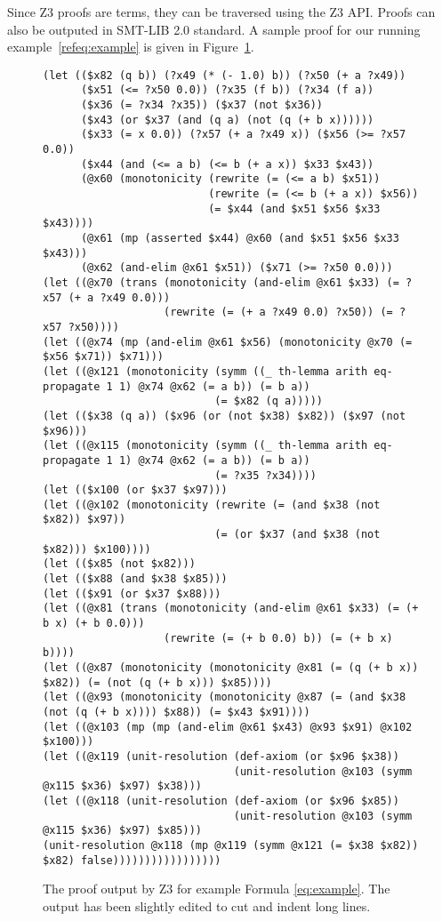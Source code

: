 \documentclass{llncs}
\begin{document}
Since Z3 proofs are terms, they can be traversed using the Z3 API.
Proofs can also be outputed in SMT-LIB 2.0 standard. A sample proof
for our running example~\ref{refeq:example} is given in
Figure~\ref{fig:proofz3}.

\begin{figure}
{\scriptsize
\begin{verbatim}
(let (($x82 (q b)) (?x49 (* (- 1.0) b)) (?x50 (+ a ?x49))
      ($x51 (<= ?x50 0.0)) (?x35 (f b)) (?x34 (f a))
      ($x36 (= ?x34 ?x35)) ($x37 (not $x36))
      ($x43 (or $x37 (and (q a) (not (q (+ b x))))))
      ($x33 (= x 0.0)) (?x57 (+ a ?x49 x)) ($x56 (>= ?x57 0.0))
      ($x44 (and (<= a b) (<= b (+ a x)) $x33 $x43))
      (@x60 (monotonicity (rewrite (= (<= a b) $x51))
                          (rewrite (= (<= b (+ a x)) $x56))
                          (= $x44 (and $x51 $x56 $x33 $x43))))
      (@x61 (mp (asserted $x44) @x60 (and $x51 $x56 $x33 $x43)))
      (@x62 (and-elim @x61 $x51)) ($x71 (>= ?x50 0.0)))
(let ((@x70 (trans (monotonicity (and-elim @x61 $x33) (= ?x57 (+ a ?x49 0.0)))
                   (rewrite (= (+ a ?x49 0.0) ?x50)) (= ?x57 ?x50))))
(let ((@x74 (mp (and-elim @x61 $x56) (monotonicity @x70 (= $x56 $x71)) $x71)))
(let ((@x121 (monotonicity (symm ((_ th-lemma arith eq-propagate 1 1) @x74 @x62 (= a b)) (= b a))
                           (= $x82 (q a)))))
(let (($x38 (q a)) ($x96 (or (not $x38) $x82)) ($x97 (not $x96)))
(let ((@x115 (monotonicity (symm ((_ th-lemma arith eq-propagate 1 1) @x74 @x62 (= a b)) (= b a))
                           (= ?x35 ?x34))))
(let (($x100 (or $x37 $x97)))
(let ((@x102 (monotonicity (rewrite (= (and $x38 (not $x82)) $x97))
                           (= (or $x37 (and $x38 (not $x82))) $x100))))
(let (($x85 (not $x82)))
(let (($x88 (and $x38 $x85)))
(let (($x91 (or $x37 $x88)))
(let ((@x81 (trans (monotonicity (and-elim @x61 $x33) (= (+ b x) (+ b 0.0)))
                   (rewrite (= (+ b 0.0) b)) (= (+ b x) b))))
(let ((@x87 (monotonicity (monotonicity @x81 (= (q (+ b x)) $x82)) (= (not (q (+ b x))) $x85))))
(let ((@x93 (monotonicity (monotonicity @x87 (= (and $x38 (not (q (+ b x)))) $x88)) (= $x43 $x91))))
(let ((@x103 (mp (mp (and-elim @x61 $x43) @x93 $x91) @x102 $x100)))
(let ((@x119 (unit-resolution (def-axiom (or $x96 $x38))
                              (unit-resolution @x103 (symm @x115 $x36) $x97) $x38)))
(let ((@x118 (unit-resolution (def-axiom (or $x96 $x85))
                              (unit-resolution @x103 (symm @x115 $x36) $x97) $x85)))
(unit-resolution @x118 (mp @x119 (symm @x121 (= $x38 $x82)) $x82) false)))))))))))))))))
\end{verbatim}
}
\caption{\label{fig:proofz3} The proof output by Z3 for example Formula \ref{eq:example}. The output has been slightly edited to cut and indent long lines.}
\end{figure}
\end{document}

